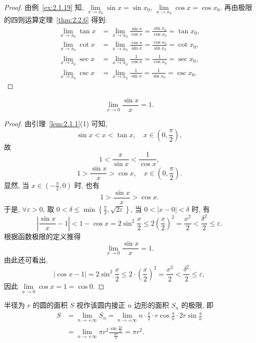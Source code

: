 \begin{proof}
由例~\ref{ex:2.1.19} 知, $\lim\limits_{x\to x_0}\sin x=\sin x_0$, $\lim\limits_{x\to x_0}\cos x=\cos x_0$. 再由极限的四则运算定理~\ref{thm:2.2.6} 得到:
\begin{align*}
\lim_{x\to x_{0}}\tan x &= \lim_{x\to x_{0}}\frac{\sin x}{\cos x}=\frac{\sin x_{0}}{\cos x_{0}}=\tan x_{0}, \\
\lim_{x\to x_{0}}\cot x &= \lim_{x\to x_{0}}\frac{\cos x}{\sin x}=\frac{\cos x_{0}}{\sin x_{0}}=\cot x_{0}, \\
\lim_{x\to x_{0}}\sec x &= \lim_{x\to x_{0}}\frac{1}{\cos x}=\frac{1}{\cos x_{0}}=\sec x_{0}, \\
\lim_{x\to x_{0}}\csc x &= \lim_{x\to x_{0}}\frac{1}{\sin x}=\frac{1}{\sin x_{0}}=\csc x_{0}.
\end{align*}
\end{proof}

\begin{example}[两个重要极限之一]\label{ex:2.2.7}
\[
\lim_{x\to 0}\frac{\sin x}{x}=1.
\]
\end{example}

\begin{proof}
由引理~\ref{lem:2.1.1}(1) 可知,
\[
\sin x < x < \tan x, \quad x \in \left(0, \frac{\pi}{2}\right),
\]
故
\[
1 < \frac{x}{\sin x} < \frac{1}{\cos x},
\]
\[
1 > \frac{\sin x}{x} > \cos x, \quad x \in \left(0, \frac{\pi}{2}\right).
\]
显然, 当 $x \in \left(-\frac{\pi}{2}, 0\right)$ 时, 也有
\[
1 > \frac{\sin x}{x} > \cos x.
\]
于是, $\forall\varepsilon>0$, 取 $0<\delta\leqslant\min\left\{\frac{\pi}{2}, \sqrt{2\varepsilon}\right\}$, 当 $0<|x-0|<\delta$ 时, 有
\[
\left|\frac{\sin x}{x}-1\right| < 1-\cos x=2\sin^{2}\frac{x}{2}\leqslant 2\left(\frac{x}{2}\right)^{2}=\frac{x^{2}}{2}<\frac{\delta^{2}}{2}\leqslant\varepsilon.
\]
根据函数极限的定义推得
\[
\lim_{x\to 0}\frac{\sin x}{x}=1.
\]
由此还可看出,
\[
|\cos x-1|=2\sin^{2}\frac{x}{2}\leqslant 2\cdot\left(\frac{x}{2}\right)^{2}=\frac{x^{2}}{2}<\frac{\delta^{2}}{2}\leqslant\varepsilon,
\]
因此 $\lim\limits_{x\to 0}\cos x=1=\cos 0$.
\end{proof}

\begin{example}\label{ex:2.2.8}
半径为 $r$ 的圆的面积 $S$ 视作该圆内接正 $n$ 边形的面积 $S_{n}$ 的极限, 即
\begin{align*}
S &= \lim_{n\to+\infty}S_n = \lim_{n\to+\infty}n\cdot\frac{1}{2}\cdot r\cos\frac{\pi}{n}\cdot 2r\sin\frac{\pi}{n} \\
&= \lim_{n\to+\infty}\pi r^2\frac{\sin\frac{2\pi}{n}}{\frac{2\pi}{n}}=\pi r^2.
\end{align*}
\end{example}

